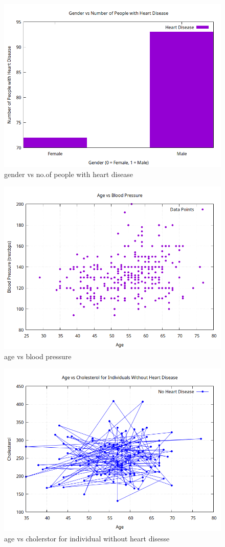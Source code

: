 \documentclass{article}
\begin{document}
\begin{figure}
	\centering
	\includegraphics{gender_heart_disease_histogram.png}
	\caption{\label{fig:1}gender vs no.of people with heart disease}
\end{figure}

\begin{figure}
	\centering
	\includegraphics{age_vs_bp_scatter.png}
	\caption{\label{fig:2} age vs blood pressure}
\end{figure}

\begin{figure}
	\centering
	\includegraphics{age_vs_chol_no_disease.png}
	\caption{\label{fig:3}age vs cholerstor for individual without heart disesse }
\end{figure}
\end{document}
